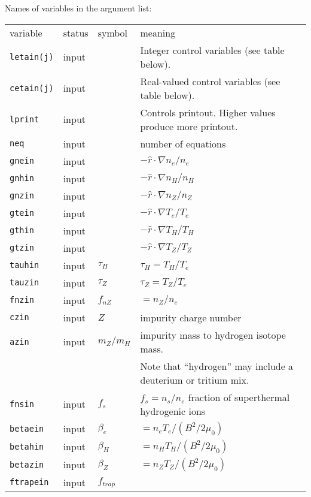 \newpage
\renewcommand{\arraystretch}{1.0}
\begin{center}
Names of variables in the argument list:
\begin{tabular}{lllp{3.0in}}
variable & status & symbol & meaning \\
{\tt letain(j)} & input & & Integer control variables
                            (see table below).\\
{\tt cetain(j)} & input & & Real-valued control variables
                            (see table below).\\
{\tt lprint}    & input & & Controls printout. 
 Higher values produce more printout. \\
{\tt neq} & input & & number of equations \\
{\tt gnein} & input & $  $ 
    & $ - \hat{r} \cdot \nabla n_e / n_e $ \\
{\tt gnhin} & input & $  $
    & $ - \hat{r} \cdot \nabla n_H / n_H $ \\
{\tt gnzin} & input & $  $
    & $ - \hat{r} \cdot \nabla n_Z / n_Z $ \\
{\tt gtein} & input & $  $
    & $ - \hat{r} \cdot \nabla T_e / T_e $ \\
{\tt gthin} & input & $  $
    & $ - \hat{r} \cdot \nabla T_H / T_H $ \\
{\tt gtzin} & input & $  $
    & $ - \hat{r} \cdot \nabla T_Z / T_Z $ \\
{\tt tauhin} & input & $\tau_H$ & $ \tau_H = T_H / T_e $ \\
{\tt tauzin} & input & $\tau_Z$ & $ \tau_Z = T_Z / T_e $ \\
{\tt fnzin} & input & $ f_{nZ} $ & $ = n_Z / n_e $ \\
{\tt czin}  & input & $ Z $ & impurity charge number \\
{\tt azin}  & input & $ m_Z / m_H $
     & impurity mass to hydrogen isotope mass. \\
 & & & Note that ``hydrogen'' may include a deuterium or tritium mix. \\
{\tt fnsin}  & input & $ f_s $
  & $ f_s = n_s / n_e $ fraction of superthermal hydrogenic ions \\
{\tt betaein} & input & $\beta_e$ &
     $ = n_e T_e / ( B^2 / 2 \mu_0 ) $ \\
{\tt betahin} & input & $\beta_H$ &
     $ = n_H T_H / ( B^2 / 2 \mu_0 ) $ \\
{\tt betazin} & input & $\beta_Z$ &
     $ = n_Z T_Z / ( B^2 / 2 \mu_0 ) $ \\
{\tt ftrapein}  & input & $f_{trap} $ &

\end{tabular}
\end{center}
